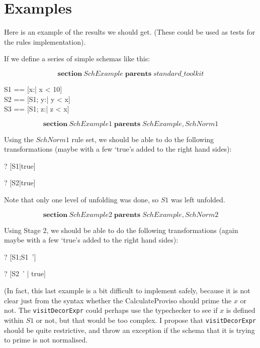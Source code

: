 \documentclass{article}
\newenvironment{zsection}{\[}{\]}
\newcommand{\SECTION}{\textbf{section}~}
\newcommand{\parents}{\mathrel{\textbf{parents}}}
\begin{document}
\section*{Examples}
Here is an example of the results we should get.
(These could be used as tests for the rules implementation).

If we define a series of simple schemas like this:

\begin{zsection}
  \SECTION SchExample \parents standard\_toolkit 
\end{zsection}

\begin{zed}
  S1 == [x:\nat | x < 10] \\
  S2 == [S1; y:\nat | y < x] \\
  S3 == [S1; z:\nat | z < x]
\end{zed}


\begin{zsection}
  \SECTION SchExample1 \parents SchExample, SchNorm1
\end{zsection}

Using the $SchNorm1$ rule set, we should be able to
do the following transformations (maybe with a few
`true's added to the right hand sides):

\begin{zed}
\vdash? [S1|true] \unfoldsTo [x:\nat | x<10]
\end{zed}
\begin{zed}
\vdash? [S2|true] \unfoldsTo [S1; y:\nat | y<x]
\end{zed}

Note that only one level of unfolding was done, so $S1$ was left unfolded.



\begin{zsection}
  \SECTION SchExample2 \parents SchExample, SchNorm2
\end{zsection}

Using Stage 2, we should be able to
do the following transformations (again maybe with a few
`true's added to the right hand sides):

\begin{zed}
\vdash? [S1;S1~'] 
\end{zed}
\begin{zed}
\vdash? [S2~' | true] \unfoldsTo [S1~'; y':\nat | y'<x']
\end{zed}

(In fact, this last example is a bit difficult to implement safely,
because it is not clear just from the syntax whether the CalculateProviso
should prime the $x$ or not.  The \verb!visitDecorExpr! could perhaps
use the typechecker to see if $x$ is defined within $S1$ or not, but
that would be too complex.  I propose that \verb!visitDecorExpr! should
be quite restrictive, and throw an exception if the schema that it
is trying to prime is not normalised.
\end{document}
